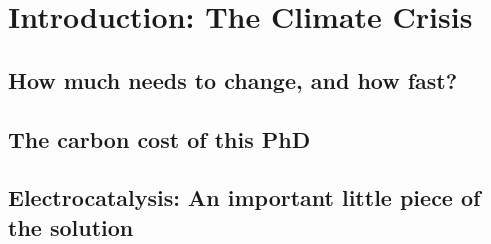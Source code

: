 
\chapter{Introduction: The Climate Crisis}

\section{How much needs to change, and how fast?}

\section{The carbon cost of this PhD}

\section{Electrocatalysis: An important little piece of the solution}\label{sec:our_part}